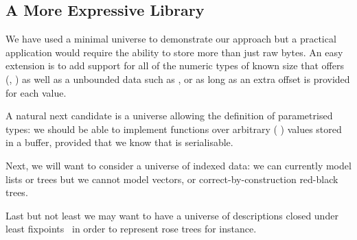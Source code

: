 \subsection{A More Expressive Library}

We have used a minimal universe to demonstrate our approach but a practical
application would require the ability to store more than just raw bytes.
An easy extension is to add support for all of the numeric types of
known size that \idris{} offers
(, )
as well as a unbounded data such as , or 
as long as an extra offset is provided for each value.

A natural next candidate is a universe allowing the definition of parametrised
types: we should be able to implement functions over arbitrary
( ) values stored in a buffer,
provided that we know that  is serialisable.

Next, we will want to consider a universe of indexed data: we can currently
model lists or trees but we cannot model vectors, or correct-by-construction
red-black trees.

Last but not least we may want to have a universe of descriptions closed
under least fixpoints~\cite{DBLP:phd/ethos/Morris07}
in order to represent rose trees for instance.
